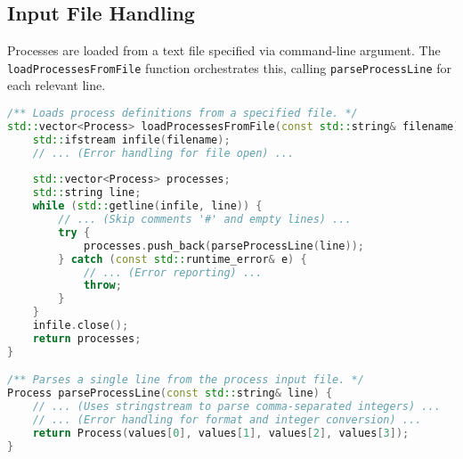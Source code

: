 \documentclass[12pt]{article}
\begin{document}
\subsection{Input File Handling}
Processes are loaded from a text file specified via command-line argument. The \texttt{loadProcessesFromFile} function orchestrates this, calling \texttt{parseProcessLine} for each relevant line.
\begin{lstlisting}[language=C++, caption={Input File Parsing Logic (main.cpp)}, style=cppstyle]
/** Loads process definitions from a specified file. */
std::vector<Process> loadProcessesFromFile(const std::string& filename) {
    std::ifstream infile(filename);
    // ... (Error handling for file open) ...
    
    std::vector<Process> processes;
    std::string line;
    while (std::getline(infile, line)) {
        // ... (Skip comments '#' and empty lines) ...
        try {
            processes.push_back(parseProcessLine(line));
        } catch (const std::runtime_error& e) {
            // ... (Error reporting) ...
            throw; 
        }
    }
    infile.close();
    return processes;
}

/** Parses a single line from the process input file. */
Process parseProcessLine(const std::string& line) {
    // ... (Uses stringstream to parse comma-separated integers) ...
    // ... (Error handling for format and integer conversion) ...
    return Process(values[0], values[1], values[2], values[3]);
}
\end{lstlisting}
\end{document}
